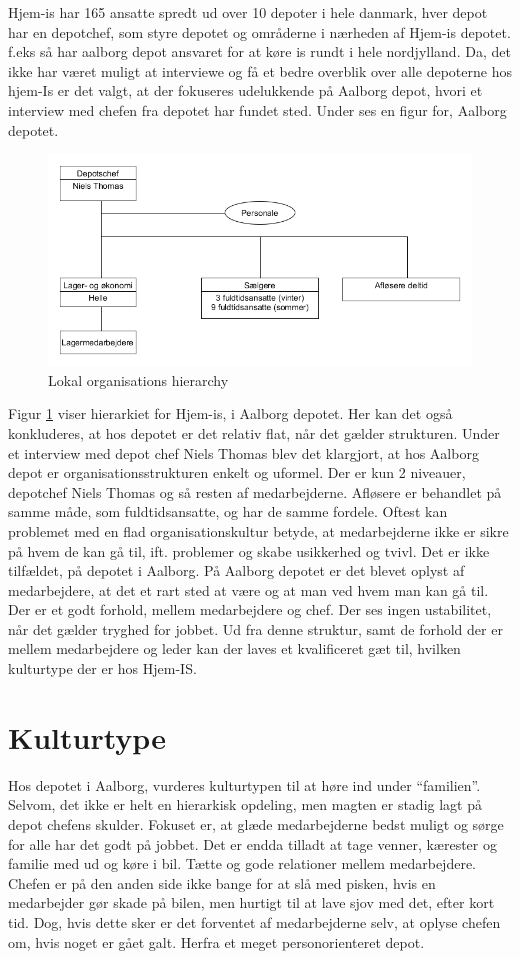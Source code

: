 Hjem-is har 165 ansatte spredt ud over 10 depoter i hele danmark, hver depot har en depotchef, som styre depotet og områderne i nærheden af Hjem-is depotet. f.eks så har aalborg depot ansvaret for at køre is rundt i hele nordjylland. Da, det ikke har været muligt at interviewe og få et bedre overblik over alle depoterne hos hjem-Is er det valgt, at der fokuseres udelukkende på Aalborg depot, hvori et interview med chefen fra depotet har fundet sted. Under ses en figur for, Aalborg depotet. 
\begin{figure}[H]
    \centering
    \includegraphics[width=\textwidth]{figures/businesscase/local_hierarchy.png}
    \caption{Lokal organisations hierarchy}
    \label{fig:local_hierarchy}
\end{figure}
Figur \ref{fig:local_hierarchy} viser hierarkiet for Hjem-is, i Aalborg depotet. Her kan det også konkluderes, at hos depotet er det relativ flat, når det gælder strukturen. Under et interview med depot chef Niels Thomas blev det klargjort, at hos Aalborg depot er organisationsstrukturen enkelt og uformel. Der er kun 2 niveauer, depotchef Niels Thomas og så resten af medarbejderne. Afløsere er behandlet på samme måde, som fuldtidsansatte, og har de samme fordele. Oftest kan problemet med en flad organisationskultur betyde, at medarbejderne ikke er sikre på hvem de kan gå til, ift. problemer og skabe usikkerhed og tvivl. Det er ikke tilfældet, på depotet i Aalborg. På Aalborg depotet er det blevet oplyst af medarbejdere, at det et rart sted at være og at man ved hvem man kan gå til. Der er et godt forhold, mellem medarbejdere og chef. Der ses ingen ustabilitet, når det gælder tryghed for jobbet. Ud fra denne struktur, samt de forhold der er mellem medarbejdere og leder kan der laves et kvalificeret gæt til, hvilken kulturtype der er hos Hjem-IS.
\section{Kulturtype}
Hos depotet i Aalborg, vurderes kulturtypen til at høre ind under “familien”. Selvom, det ikke er helt en hierarkisk opdeling, men magten er stadig lagt på depot chefens skulder. Fokuset er, at glæde medarbejderne bedst muligt og sørge for alle har det godt på jobbet. Det er endda tilladt at tage venner, kærester og familie med ud og køre i bil. Tætte og gode relationer mellem medarbejdere. Chefen er på den anden side ikke bange for at slå med pisken, hvis en medarbejder gør skade på bilen, men hurtigt til at lave sjov med det, efter kort tid. Dog, hvis dette sker er det forventet af medarbejderne selv, at oplyse chefen om, hvis noget er gået galt. Herfra et meget personorienteret depot.
